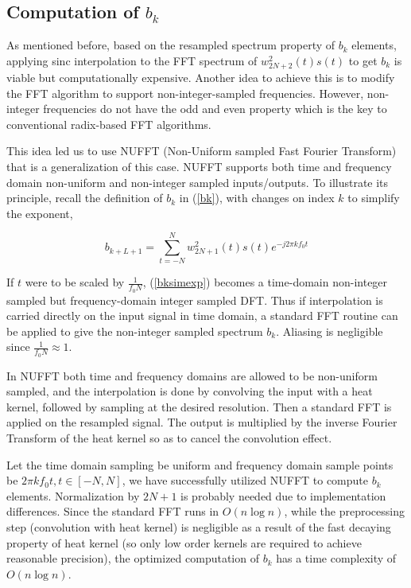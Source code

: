 \documentclass[dvips]{article}
\begin{document}
\subsection{Computation of $b_k$}

As mentioned before, based on the resampled spectrum property of $b_k$ elements, applying sinc interpolation to the FFT spectrum of $w_{2N + 2}^2(t)s(t)$ to get $b_k$ is viable but computationally expensive. Another idea to achieve this is to modify the FFT algorithm to support non-integer-sampled frequencies. However, non-integer frequencies do not have the odd and even property which is the key to conventional radix-based FFT algorithms\cite{cooley-1965}.

This idea led us to use NUFFT (Non-Uniform sampled Fast Fourier Transform)\cite{greengard-2004} that is a generalization of this case. NUFFT supports both time and frequency domain non-uniform and non-integer sampled inputs/outputs. To illustrate its principle, recall the definition of $b_k$ in (\ref{bk}), with changes on index $k$ to simplify the exponent,

\begin{equation} \label{bksimexp}
b_{k + L + 1} = \sum_{t = -N}^{N} w_{2N + 1}^2(t) s(t) e^{-j 2\pi k f_0 t}
\end{equation}

If $t$ were to be scaled by $\frac{1}{f_0 N}$, (\ref{bksimexp}) becomes a time-domain non-integer sampled but frequency-domain integer sampled DFT. Thus if interpolation is carried directly on the input signal in time domain, a standard FFT routine can be applied to give the non-integer sampled spectrum $b_k$. Aliasing is negligible since $\frac{1}{f_0 N} \approx 1$.

In NUFFT both time and frequency domains are allowed to be non-uniform sampled, and the interpolation is done by convolving the input with a heat kernel, followed by sampling at the desired resolution. Then a standard FFT is applied on the resampled signal. The output is multiplied by the inverse Fourier Transform of the heat kernel so as to cancel the convolution effect.

Let the time domain sampling be uniform and frequency domain sample points be $2\pi k f_0 t, t \in [-N, N]$, we have successfully utilized NUFFT to compute $b_k$ elements. Normalization by $2N + 1$ is probably needed due to implementation differences. Since the standard FFT runs in $O(n \log n)$, while the preprocessing step (convolution with heat kernel) is negligible as a result of the fast decaying property of heat kernel (so only low order kernels are required to achieve reasonable precision), the optimized computation of $b_k$ has a time complexity of $O(n \log n)$.
\end{document}
